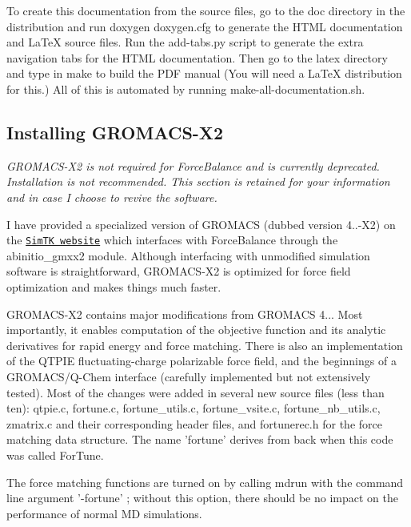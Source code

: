 To create this documentation from the source files, go to the {\ttfamily doc} directory in the distribution and run {\ttfamily  doxygen doxygen.\-cfg } to generate the H\-T\-M\-L documentation and La\-Te\-X source files. Run the {\ttfamily add-\/tabs.\-py} script to generate the extra navigation tabs for the H\-T\-M\-L documentation. Then go to the {\ttfamily latex} directory and type in {\ttfamily make} to build the P\-D\-F manual (You will need a La\-Te\-X distribution for this.) All of this is automated by running {\ttfamily make-\/all-\/documentation.\-sh}.\hypertarget{installation_install_gmxx2}{}\subsection{Installing G\-R\-O\-M\-A\-C\-S-\/\-X2}\label{installation_install_gmxx2}
{\itshape  G\-R\-O\-M\-A\-C\-S-\/\-X2 is not required for Force\-Balance and is currently deprecated. Installation is not recommended. This section is retained for your information and in case I choose to revive the software. }

I have provided a specialized version of G\-R\-O\-M\-A\-C\-S (dubbed version 4..-\/\-X2) on the \href{https://simtk.org/home/forcebalance/}{\tt Sim\-T\-K website} which interfaces with Force\-Balance through the abinitio\-\_\-gmxx2 module. Although interfacing with unmodified simulation software is straightforward, G\-R\-O\-M\-A\-C\-S-\/\-X2 is optimized for force field optimization and makes things much faster.

G\-R\-O\-M\-A\-C\-S-\/\-X2 contains major modifications from G\-R\-O\-M\-A\-C\-S 4... Most importantly, it enables computation of the objective function and its analytic derivatives for rapid energy and force matching. There is also an implementation of the Q\-T\-P\-I\-E fluctuating-\/charge polarizable force field, and the beginnings of a G\-R\-O\-M\-A\-C\-S/\-Q-\/\-Chem interface (carefully implemented but not extensively tested). Most of the changes were added in several new source files (less than ten)\-: {\ttfamily qtpie.\-c}, {\ttfamily fortune.\-c}, {\ttfamily fortune\-\_\-utils.\-c}, {\ttfamily fortune\-\_\-vsite.\-c}, {\ttfamily fortune\-\_\-nb\-\_\-utils.\-c}, {\ttfamily zmatrix.\-c} and their corresponding header files, and {\ttfamily fortunerec.\-h} for the force matching data structure. The name 'fortune' derives from back when this code was called For\-Tune.

The force matching functions are turned on by calling {\ttfamily mdrun} with the command line argument {\ttfamily '-\/fortune'} ; without this option, there should be no impact on the performance of normal M\-D simulations.

